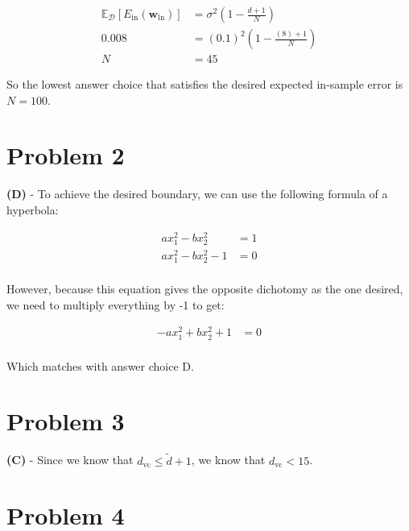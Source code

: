 \documentclass[10pt,letter]{article}
\begin{document}
\begin{align*}
\mathbb{E}_\mathcal{D}[E_\textrm{in}(\boldsymbol{w}_\textrm{ln})] & = \sigma^2(1 - \frac{d+1}{N}) \\
0.008 & = (0.1)^2(1 - \frac{(8)+1}{N}) \\
N & = 45
\end{align*}

So the lowest answer choice that satisfies the desired expected in-sample error is $N = 100$.

\section*{Problem 2}

\textbf{(D)} - To achieve the desired boundary, we can use the following formula of a hyperbola:

\begin{align*}
ax_1^2 - bx_2^2 & = 1 \\
ax_1^2 - bx_2^2 -1 & = 0 \\
\end{align*}

However, because this equation gives the opposite dichotomy as the one desired, we need to multiply everything by -1 to get:

\begin{align*}
-ax_1^2 + bx_2^2 +1 & = 0 \\
\end{align*}

Which matches with answer choice D.


\section*{Problem 3} 

\textbf{(C)} - Since we know that $d_\textrm{vc} \leq \tilde{d} + 1$, we know that $d_\textrm{vc} < 15$.

\section*{Problem 4}
\end{document}

